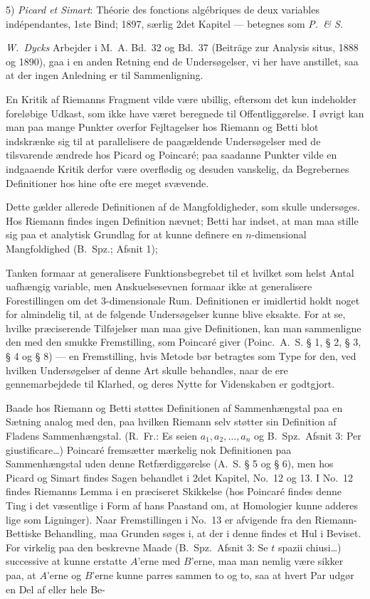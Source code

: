 \documentclass{article}
\begin{document}
5) \emph{Picard et Simart}: Théorie des fonctions algébriques de deux variables indépendantes, 1ste Bind; 1897, særlig 2det Kapitel --- betegnes som \emph{P.\ \& S.}

\emph{W.~Dycks} Arbejder i M.~A. Bd.\ 32 og Bd.\ 37 (Beiträge zur Analysis situs, 1888 og 1890), gaa i en anden Retning end de Undersøgelser, vi her have anstillet, saa at der ingen Anledning er til Sammenligning.

En Kritik af Riemanns Fragment vilde være ubillig, eftersom det kun indeholder foreløbige Udkast, som ikke have været beregnede til Offentliggørelse. I øvrigt kan man paa mange Punkter overfor Fejltagelser hos Riemann og Betti blot indskrænke sig til at parallelisere de paagældende Undersøgelser med de tilsvarende ændrede hos Picard og Poincaré; paa saadanne Punkter vilde en indgaaende Kritik derfor være overflødig og desuden vanskelig, da Begrebernes Definitioner hos hine ofte ere meget svævende.

Dette gælder allerede Definitionen af de Mangfoldigheder, som skulle undersøges. Hos Riemann findes ingen Definition nævnet; Betti har indset, at man maa stille sig paa et analytisk Grundlag for at kunne definere en $n$-dimensional Mangfoldighed (B.~Spz.; Afsnit 1);

Tanken formaar at generalisere Funktionsbegrebet til et hvilket som helst Antal uafhængig variable, men Anskuelsesevnen formaar ikke at generalisere Forestillingen om det 3-dimensionale Rum. Definitionen er imidlertid holdt noget for almindelig til, at de følgende Undersøgelser kunne blive eksakte. For at se, hvilke præciserende Tilføjelser man maa give Definitionen, kan man sammenligne den med den smukke Fremstilling, som Poincaré giver (Poinc.\ A.~S. § 1, § 2, § 3, § 4 og § 8) --- en Fremstilling, hvis Metode bør betragtes som Type for den, ved hvilken Undersøgelser af denne Art skulle behandles, naar de ere gennemarbejdede til Klarhed, og deres Nytte for Videnskaben er godtgjort.

Baade hos Riemann og Betti støttes Definitionen af Sammenhængstal paa en Sætning analog med den, paa hvilken Riemann selv støtter sin Definition af Fladens Sammenhængstal. (R.~Fr.: Es seien $a_1, a_2, \dots, a_n$ og B.~Spz.\ Afsnit 3: Per giustificare\dots) Poincaré fremsætter mærkelig nok Definitionen paa Sammenhængstal uden denne Retfærdiggørelse (A.~S. § 5 og § 6), men hos Picard og Simart findes Sagen behandlet i 2det Kapitel, No.\ 12 og 13. I No.\ 12 findes Riemanns Lemma i en præciseret Skikkelse (hos Poincaré findes denne Ting i det væsentlige i Form af hans Paastand om, at Homologier kunne adderes lige som Ligninger). Naar Fremstillingen i No.\ 13 er afvigende fra den Riemann-Bettiske Behandling, maa Grunden søges i, at der i denne findes et Hul i Beviset. For virkelig paa den beskrevne Maade (B.~Spz.\ Afsnit 3: Se $t$ spazii chiusi\dots) successive at kunne erstatte $A$'erne med $B$'erne, maa man nemlig være sikker paa, at $A$'erne og $B$'erne kunne parres sammen to og to, saa at hvert Par udgør en Del af eller hele Be-
\end{document}
